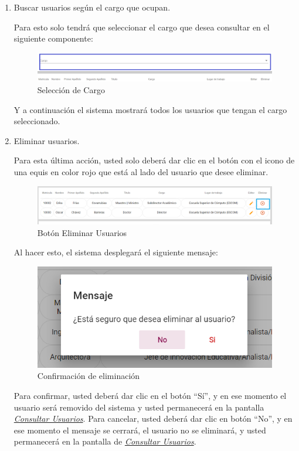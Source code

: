 \begin{enumerate}

	\item   Buscar usuarios según el cargo que ocupan.

	Para esto solo tendrá que seleccionar el cargo que desea consultar en el siguiente componente:

	\begin{figure}[H]
		\centering
		\hypertarget{cargo1}{\includegraphics[width=0.7\linewidth]{images/SP5/BtnCargo1}}
		\caption{Selección de Cargo}
		\label{cargo1}
	\end{figure}

	Y a continuación el sistema mostrará todos los usuarios que tengan el cargo seleccionado.

	   \newpage

	\item Eliminar usuarios.

	Para esta última acción, usted solo deberá dar clic en el botón con el icono de una equis en color rojo que está al lado del usuario que desee  eliminar.

	\begin{figure}[H]
		\centering
		\hypertarget{eliminar}{\includegraphics[width=0.7\linewidth]{images/SP5/BtnEliminar}}
		\caption{Botón Eliminar Usuarios}
		\label{eliminar}
	\end{figure}

	Al hacer esto, el sistema desplegará el siguiente mensaje:

	\begin{figure}[H]
		\centering
		\includegraphics[width=0.4\linewidth]{images/SP5/MSG22}
		\caption{Confirmación de eliminación}
		\label{confirmarE}

	\end{figure}

	Para confirmar, usted deberá dar clic en el botón “Sí”, y en ese momento el usuario será removido del sistema y usted permanecerá en la pantalla \hyperlink{consultarUs}{\textit{Consultar Usuarios}}.
	Para cancelar, usted deberá dar clic en botón “No”, y en ese momento el mensaje se cerrará, el usuario no se eliminará, y usted permanecerá en la pantalla de \hyperlink{consultarUs}{\textit{Consultar Usuarios}}.

\end{enumerate}

